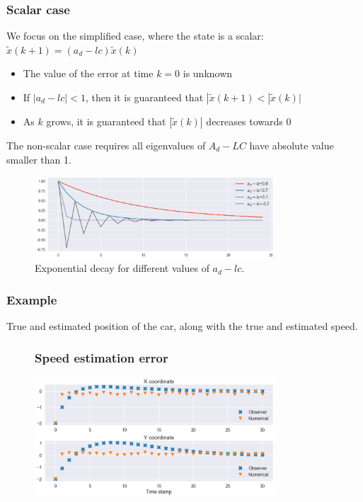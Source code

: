 \begin{frame}
	\frametitle{Scalar case}
	We focus on the simplified case, where the state is a scalar: $\tilde{x}(k+1)= (a_d-lc)\tilde{x}(k)$
	
	\begin{itemize}
		\item The value of the error at time $k=0$ is unknown
		\item If $|a_d-lc|<1$, then it is guaranteed that $|\tilde{x}(k+1)< |\tilde{x}(k)|$
		\item As $k$ grows, it is guaranteed that $|\tilde{x}(k)|$ decreases towards 0
	\end{itemize}

	The non-scalar case requires all eigenvalues of $A_d-LC$ have absolute value smaller than 1.
	
	\begin{figure}[b]
		\includegraphics[width=0.8\textwidth]{fig/exponential_decay}
		\caption*{Exponential decay for different values of $a_d-lc$.}
	\end{figure}
	
	
	
\end{frame}

\begin{frame}
    \frametitle{Example}
    True and estimated position of the car, along with the true and estimated speed.
\end{frame}

\begin{frame}
\begin{figure}[b]
	\frametitle{Speed estimation error}
	\includegraphics[width=0.8\textwidth]{fig/speed_estimation_error_ex_1}
\end{figure}
\end{frame}	